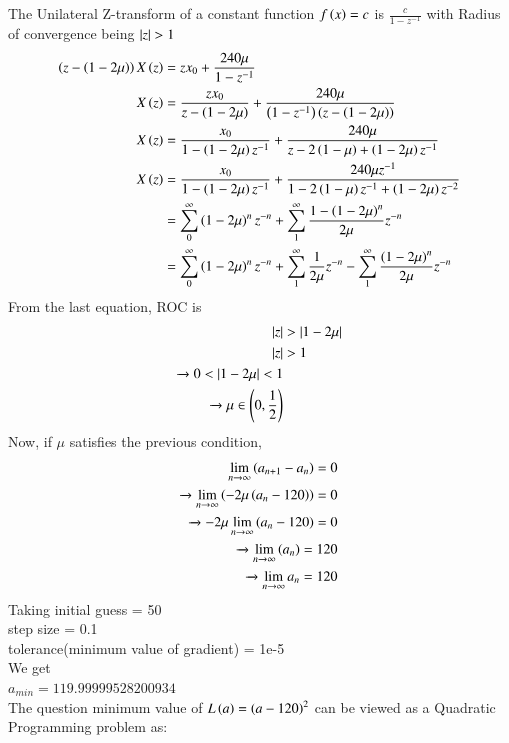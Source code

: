 \documentclass[journal]{IEEEtran}
\begin{document}
The Unilateral Z-transform of a constant function $f\left(x\right) = c$ is $\frac{c}{1-z^{-1}}$ with Radius of convergence being $\left\vert z\right\vert>1$
\begin{align}
    \left(z - \left(1-2\mu\right)\right)X\left(z\right) &= zx_0+\frac{240\mu}{1-z^{-1}}\\
    X\left(z\right) &= \frac{zx_0}{z - \left(1-2\mu\right)}+\frac{240\mu}{\left(1-z^{-1}\right)\left(z - \left(1-2\mu\right)\right)}\\
    X\left(z\right) &= \frac{x_0}{1 - \left(1-2\mu\right)z^{-1}}+\frac{240\mu}{z-2\left(1-\mu\right)+\left(1-2\mu\right)z^{-1}}\\
    X\left(z\right) &= \frac{x_0}{1 - \left(1-2\mu\right)z^{-1}}+\frac{240\mu z^{-1}}{1-2\left(1-\mu\right)z^{-1}+\left(1-2\mu\right)z^{-2}}\\
    &= \sum_{0}^{\infty} \left(1-2\mu\right)^n z^{-n}+\sum_{1}^{\infty}\frac{1-\left(1-2\mu\right)^n}{2\mu}z^{-n}\\
    &= \sum_{0}^{\infty} \left(1-2\mu\right)^n z^{-n}+\sum_{1}^{\infty}\frac{1}{2\mu}z^{-n}-\sum_{1}^{\infty}\frac{\left(1-2\mu\right)^n}{2\mu}z^{-n}\\
\end{align}
From the last equation, ROC is 
\begin{align}
    \left\vert z\right\vert &> \left\vert1-2\mu\right\vert\\
    \left\vert z\right\vert &> 1 \\
    \xrightarrow{} 0 < |1-2\mu| < 1\\
    \xrightarrow{} \mu \in \left(0, \frac{1}{2}\right)
\end{align}
Now, if $\mu$ satisfies the previous condition,
\begin{align}
    \lim_{n \to \infty} \left(a_{n+1} - a_n\right) = 0\\
    \xrightarrow{} \lim_{n \to \infty} \left(- 2\mu\left(a_n-120\right)\right) = 0\\
    \xrightarrow{} {-2\mu}\lim_{n \to \infty} \left(a_n-120\right) = 0\\
    \xrightarrow{} \lim_{n \to \infty} \left(a_n\right) = 120\\
    \xrightarrow{} \lim_{n \to \infty} a_n = 120
\end{align}
Taking initial guess = 50\\ step size = 0.1\\ tolerance(minimum value of gradient) = 1e-5\\ We get \\
$a_{min} = 119.99999528200934$\\
The question minimum value of $L\left(a\right) = \left(a-120\right)^2$ can be viewed as a Quadratic Programming problem as:\\
\end{document}
